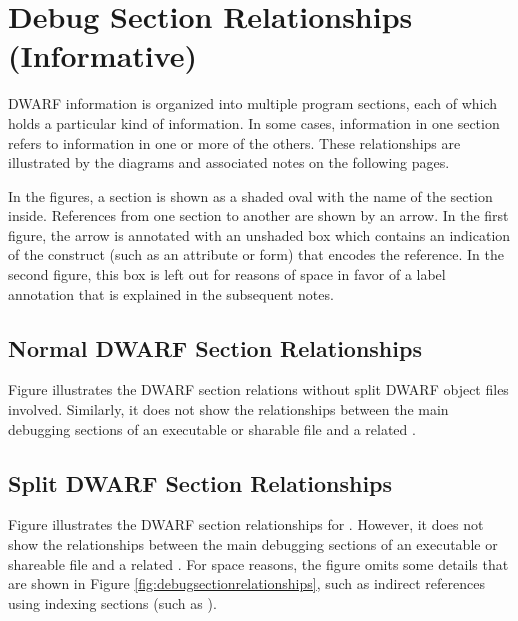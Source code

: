 \chapter{Debug Section Relationships (Informative)}
\label{app:debugsectionrelationshipsinformative}
DWARF information is organized into multiple program sections, 
each of which holds a particular kind of information. In some 
cases, information in one section refers to information in one 
or more of the others. These relationships are illustrated by 
the diagrams and associated notes on the following pages.

In the figures, a section is shown as a shaded oval with the
name of the section inside. References from one section to
another are shown by an arrow. In the first figure, the arrow
is annotated with an unshaded box which contains an indication
of the construct (such as an attribute or form) that encodes
the reference. In the second figure, this box is left out
for reasons of space in favor of a label annotation that is
explained in the subsequent notes.

\section{Normal DWARF Section Relationships}
Figure  illustrates
the DWARF section relations without split DWARF object files
involved. Similarly, it does not show the 
relationships between the main debugging sections of an executable
or sharable file and a related .

\section{Split DWARF Section Relationships}
Figure  illustrates
the DWARF section relationships for .
However, it does not show the 
relationships between the main debugging sections of an executable
or shareable file and a related .
\bb
For space reasons, the figure omits some details that are shown in
Figure \ref{fig:debugsectionrelationships}, such as indirect references
using indexing sections (such as \dotdebugstroffsets).
\eb

